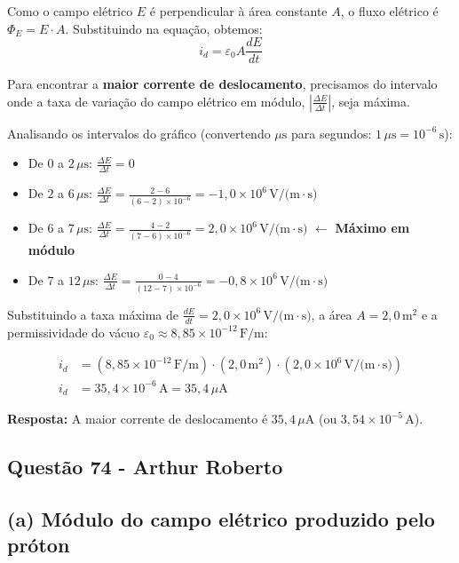 \documentclass[12pt,a4paper]{article}
\begin{document}
Como o campo elétrico $E$ é perpendicular à área constante $A$, o fluxo elétrico é $\Phi_E = E \cdot A$. Substituindo na equação, obtemos:
\begin{equation*}
i_d = \varepsilon_0 A \frac{dE}{dt}
\end{equation*}

Para encontrar a \textbf{maior corrente de deslocamento}, precisamos do intervalo onde a taxa de variação do campo elétrico em módulo, $\left| \frac{\Delta E}{\Delta t} \right|$, seja máxima. 

Analisando os intervalos do gráfico (convertendo $\mu\text{s}$ para segundos: $1\,\mu\text{s} = 10^{-6}\,\text{s}$):
\begin{itemize}
    \item De $0$ a $2\,\mu\text{s}$: $\frac{\Delta E}{\Delta t} = 0$
    \item De $2$ a $6\,\mu\text{s}$: $\frac{\Delta E}{\Delta t} = \frac{2 - 6}{(6 - 2) \times 10^{-6}} = -1,0 \times 10^6\,\text{V/(m}\cdot\text{s)}$
    \item De $6$ a $7\,\mu\text{s}$: $\frac{\Delta E}{\Delta t} = \frac{4 - 2}{(7 - 6) \times 10^{-6}} = 2,0 \times 10^6\,\text{V/(m}\cdot\text{s)}$ \quad $\leftarrow$ \textbf{Máximo em módulo}
    \item De $7$ a $12\,\mu\text{s}$: $\frac{\Delta E}{\Delta t} = \frac{0 - 4}{(12 - 7) \times 10^{-6}} = -0,8 \times 10^6\,\text{V/(m}\cdot\text{s)}$
\end{itemize}

Substituindo a taxa máxima de $\frac{dE}{dt} = 2,0 \times 10^6\,\text{V/(m}\cdot\text{s)}$, a área $A = 2,0\,\text{m}^2$ e a permissividade do vácuo $\varepsilon_0 \approx 8,85 \times 10^{-12}\,\text{F/m}$:

\begin{align*}
i_d &= (8,85 \times 10^{-12}\,\text{F/m}) \cdot (2,0\,\text{m}^2) \cdot (2,0 \times 10^6\,\text{V/(m}\cdot\text{s)}) \\
i_d &= 35,4 \times 10^{-6}\,\text{A} = 35,4\,\mu\text{A}
\end{align*}

\textbf{Resposta:} A maior corrente de deslocamento é \textbf{$35,4\,\mu\text{A}$} (ou $3,54 \times 10^{-5}\,\text{A}$).


\subsection{Questão 74 - Arthur Roberto}
\subsection*{(a) Módulo do campo elétrico produzido pelo próton}
\end{document}
